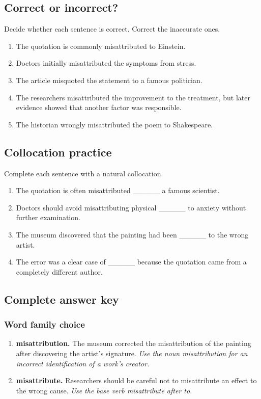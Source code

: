 \documentclass[11pt]{article}
\begin{document}
\subsection{Correct or incorrect?}
Decide whether each sentence is correct. Correct the inaccurate ones.

\begin{enumerate}
  \item The quotation is commonly misattributed to Einstein.
  \item Doctors initially misattributed the symptoms from stress.
  \item The article misquoted the statement to a famous politician.
  \item The researchers misattributed the improvement to the treatment, but later evidence showed that another factor was responsible.
  \item The historian wrongly misattributed the poem to Shakespeare.
\end{enumerate}

\subsection{Collocation practice}
Complete each sentence with a natural collocation.

\begin{enumerate}
  \item The quotation is often misattributed \_\_\_\_\_ a famous scientist.
  \item Doctors should avoid misattributing physical \_\_\_\_\_ to anxiety without further examination.
  \item The museum discovered that the painting had been \_\_\_\_\_ to the wrong artist.
  \item The error was a clear case of \_\_\_\_\_ because the quotation came from a completely different author.
\end{enumerate}

\subsection{Complete answer key}
\subsubsection{Word family choice}
\begin{enumerate}
  \item \textbf{misattribution.} The museum corrected the misattribution of the painting after discovering the artist's signature. \emph{Use the noun misattribution for an incorrect identification of a work's creator.}
  \item \textbf{misattribute.} Researchers should be careful not to misattribute an effect to the wrong cause. \emph{Use the base verb misattribute after to.}
\end{enumerate}
\end{document}
